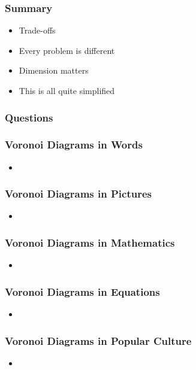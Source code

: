 \documentclass{beamer}
\begin{document}
\begin{frame}
  \frametitle{Summary}  

  \begin{itemize}
  \item Trade-offs
  \item Every problem is different
  \item Dimension matters
  \item This is all quite simplified
  \end{itemize}
\end{frame}

\begin{frame}
  \frametitle{Questions}  
\end{frame}

\begin{frame}
  \frametitle{Voronoi Diagrams in Words}

  \begin{itemize}
  \item 
  \end{itemize}
\end{frame}

\begin{frame}
  \frametitle{Voronoi Diagrams in Pictures}

  \begin{itemize}
  \item 
  \end{itemize}
\end{frame}

\begin{frame}
  \frametitle{Voronoi Diagrams in Mathematics}

  \begin{itemize}
  \item 
  \end{itemize}
\end{frame}

\begin{frame}
  \frametitle{Voronoi Diagrams in Equations}

  \begin{itemize}
  \item 
  \end{itemize}
\end{frame}

\begin{frame}
  \frametitle{Voronoi Diagrams in Popular Culture}

  \begin{itemize}
  \item 
  \end{itemize}
\end{frame}
\end{document}
